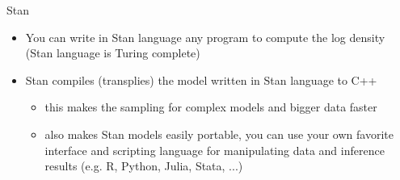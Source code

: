 \documentclass[finnish,english,t]{beamer}
\begin{document}

  



    

\begin{frame}{Stan}
  
  \begin{itemize}
  \item You can write in Stan language any program to compute the
    log density (Stan language is Turing complete)
  \item<2-> Stan compiles (transplies) the model written in Stan language to C++
    \begin{itemize}
    \item this makes the sampling for complex models and bigger data faster
    \item also makes Stan models easily portable, you can use your own
      favorite interface and scripting language for manipulating data
      and inference results (e.g. R, Python, Julia, Stata, ...)
    \end{itemize}
  \end{itemize}

\end{frame}
\end{document}
